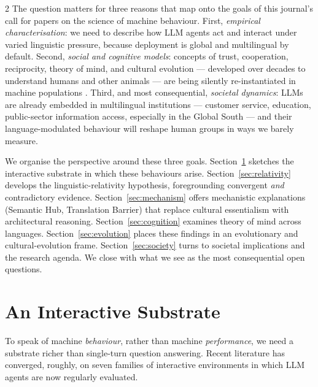 \documentclass[openacc]{rsproca_new}
\begin{document}
\begin{multicols}{2}
The question matters for three reasons that map onto the goals of this journal's call for papers on the science of machine behaviour. First, \emph{empirical characterisation}: we need to describe how LLM agents act and interact under varied linguistic pressure, because deployment is global and multilingual by default. Second, \emph{social and cognitive models}: concepts of trust, cooperation, reciprocity, theory of mind, and cultural evolution --- developed over decades to understand humans and other animals --- are being silently re-instantiated in machine populations \cite{axelrod1984evolution, tomasello2009whywecooperate, henrich2016secret}. Third, and most consequential, \emph{societal dynamics}: LLMs are already embedded in multilingual institutions --- customer service, education, public-sector information access, especially in the Global South --- and their language-modulated behaviour will reshape human groups in ways we barely measure.

We organise the perspective around these three goals. Section~\ref{sec:taxonomy} sketches the interactive substrate in which these behaviours arise. Section~\ref{sec:relativity} develops the linguistic-relativity hypothesis, foregrounding convergent \emph{and} contradictory evidence. Section~\ref{sec:mechanism} offers mechanistic explanations (Semantic Hub, Translation Barrier) that replace cultural essentialism with architectural reasoning. Section~\ref{sec:cognition} examines theory of mind across languages. Section~\ref{sec:evolution} places these findings in an evolutionary and cultural-evolution frame. Section~\ref{sec:society} turns to societal implications and the research agenda. We close with what we see as the most consequential open questions.

\section{An Interactive Substrate}
\label{sec:taxonomy}

To speak of machine \emph{behaviour}, rather than machine \emph{performance}, we need a substrate richer than single-turn question answering. Recent literature has converged, roughly, on seven families of interactive environments in which LLM agents are now regularly evaluated.


\end{multicols}
\end{document}
